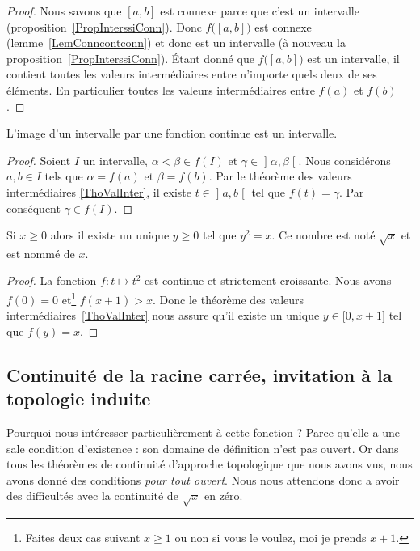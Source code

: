 \begin{proof}
Nous savons que $[a,b]$ est connexe parce que c'est un intervalle (proposition~\ref{PropInterssiConn}). Donc $f\big( [a,b] \big)$ est connexe (lemme~\ref{LemConncontconn}) et donc est un intervalle (à nouveau la proposition~\ref{PropInterssiConn}). Étant donné que $f\big( [a,b] \big)$ est un intervalle, il contient toutes les valeurs intermédiaires entre n'importe quels deux de ses éléments. En particulier toutes les valeurs intermédiaires entre $f(a)$ et $f(b)$.
\end{proof}

\begin{corollary}       \label{CorImInterInter}
L'image d'un intervalle par une fonction continue est un intervalle.
\end{corollary}

\begin{proof}
Soient \( I\) un intervalle, \( \alpha<\beta\in f(I)\) et \( \gamma\in\mathopen] \alpha , \beta \mathclose[\). Nous considérons \(a,b\in I\) tels que \( \alpha=f(a)\) et \( \beta=f(b)\). Par le théorème des valeurs intermédiaires \ref{ThoValInter}, il existe \( t\in\mathopen] a , b \mathclose[\) tel que \( f(t)=\gamma\). Par conséquent \( \gamma\in f(I)\).
\end{proof}

\begin{corollaryDef}
    Si \( x\geq 0\) alors il existe un unique \( y\geq 0\) tel que \( y^2=x\). Ce nombre est noté \( \sqrt{x}\) et est nommé  de \( x\).
\end{corollaryDef}

\begin{proof}
    La fonction \( f\colon t\mapsto t^2\) est continue et strictement croissante. Nous avons \( f(0)=0\) et\footnote{Faites deux cas suivant \( x\geq 1\) ou non si vous le voulez, moi je prends \( x+1\).} \( f(x+1)>x\). Donc le théorème des valeurs intermédiaires~\ref{ThoValInter} nous assure qu'il existe un unique \( y\in\mathopen[ 0 , x+1 \mathclose]\) tel que \( f(y)=x\).
\end{proof}

\subsection{Continuité de la racine carrée, invitation à la topologie induite}

Pourquoi nous intéresser particulièrement à cette fonction ? Parce qu'elle a une sale condition d'existence : son domaine de définition n'est pas ouvert. Or dans tous les théorèmes de continuité d'approche topologique que nous avons vus, nous avons donné des conditions \emph{pour tout ouvert}. Nous nous attendons donc a avoir des difficultés avec la continuité de $\sqrt{x}$ en zéro.

